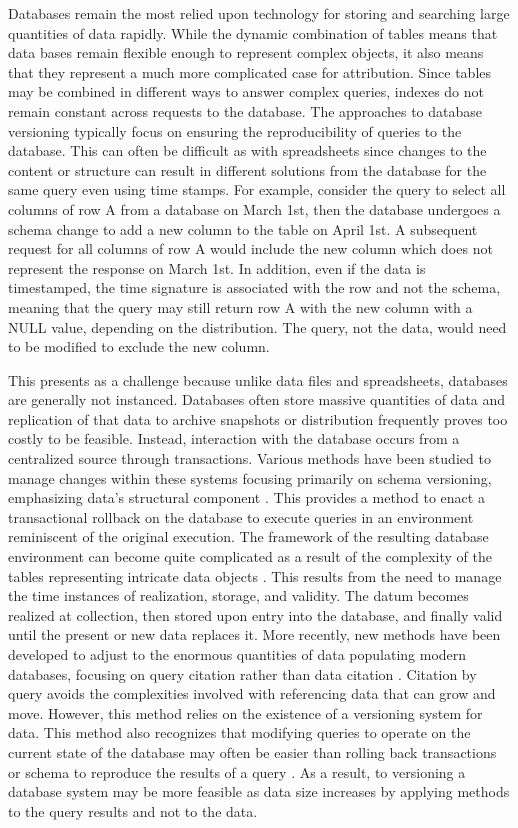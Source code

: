 Databases remain the most relied upon technology for storing and searching large quantities of data rapidly.
While the dynamic combination of tables means that data bases remain flexible enough to represent complex objects, it also means that they represent a much more complicated case for attribution.
Since tables may be combined in different ways to answer complex queries, indexes do not remain constant across requests to the database.
The approaches to database versioning typically focus on ensuring the reproducibility of queries to the database.
This can often be difficult as with spreadsheets since changes to the content or structure can result in different solutions from the database for the same query even using time stamps.
For example, consider the query to select all columns of row A from a database on March 1st, then the database undergoes a schema change to add a new column to the table on April 1st.
A subsequent request for all columns of row A would include the new column which does not represent the response on March 1st.
In addition, even if the data is timestamped, the time signature is associated with the row and not the schema, meaning that the query may still return row A with the new column with a NULL value, depending on the distribution.
The query, not the data, would need to be modified to exclude the new column.

This presents as a challenge because unlike data files and spreadsheets, databases are generally not instanced.
Databases often store massive quantities of data and replication of that data to archive snapshots or distribution frequently proves too costly to be feasible.
Instead, interaction with the database occurs from a centralized source through transactions.
Various methods have been studied to manage changes within these systems focusing primarily on schema versioning, emphasizing data's structural component \cite{roddick1996model}.
This provides a method to enact a transactional rollback on the database to execute queries in an environment reminiscent of the original execution.
The framework of the resulting database environment can become quite complicated as a result of the complexity of the tables representing intricate data objects \cite{Klahold:1986:GMV:645913.671314}.
This results from the need to manage the time instances of realization, storage, and validity.
The datum becomes realized at collection, then stored upon entry into the database, and finally valid until the present or new data replaces it.
More recently, new methods have been developed to adjust to the enormous quantities of data populating modern databases, focusing on query citation rather than data citation \cite{Proell2013} \cite{DBLP:conf/data/2013}.
Citation by query avoids the complexities involved with referencing data that can grow and move.
However, this method relies on the existence of a versioning system for data.
This method also recognizes that modifying queries to operate on the current state of the database may often be easier than rolling back transactions or schema to reproduce the results of a query \cite{proellBigData}.
As a result, to versioning a database system may be more feasible as data size increases by applying methods to the query results and not to the data.

